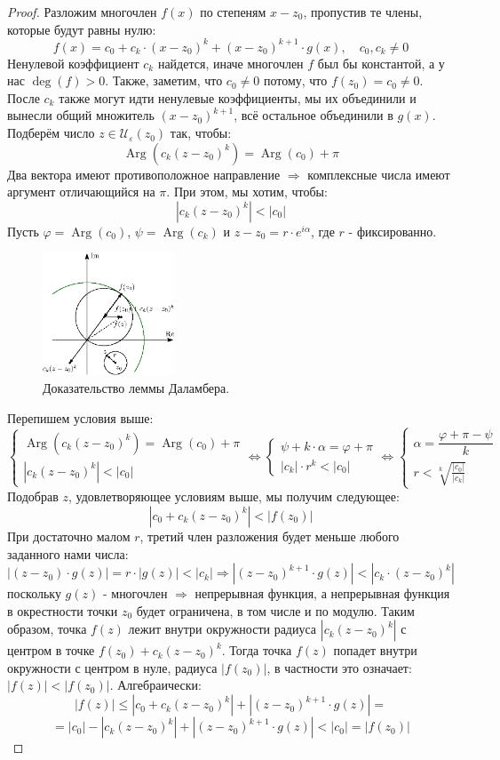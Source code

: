 \documentclass[12pt]{article}
\newcommand{\MU}{\mathcal{U}}
\newcommand{\VE}{\varepsilon}
\theoremstyle{definition}
\DeclareMathOperator\Arg{Arg}
\begin{document}
\begin{proof}
	Разложим многочлен $f(x)$ по степеням $x - z_0$, пропустив те члены, которые будут равны нулю:
	$$
		f(x) = c_0 + c_k{\cdot}(x - z_0)^k + (x - z_0)^{k+1}{\cdot}g(x), \quad c_0, c_k \neq 0
	$$
	Ненулевой коэффициент $c_k$ найдется, иначе многочлен $f$ был бы константой, а у нас $\deg(f) > 0$. Также, заметим, что $c_0 \neq 0$ потому, что $f(z_0) = c_0 \neq 0$. После $c_k$ также могут идти ненулевые коэффициенты, мы их объединили и вынесли общий множитель $(x - z_0)^{k+1}$, всё остальное объединили в $g(x)$. Подберём число $z \in \MU_{\VE}(z_0)$ так, чтобы: 
	$$
		\Arg(c_k(z- z_0)^k) = \Arg(c_0) + \pi
	$$ 
	Два вектора имеют противоположное направление $\Rightarrow$ комплексные числа имеют аргумент отличающийся на $\pi$. При этом, мы хотим, чтобы:
	$$
		|c_k(z-z_0)^k| < |c_0|
	$$
	Пусть $\varphi = \Arg(c_0)$, $\psi = \Arg(c_k)$ и $z - z_0 = r{\cdot}e^{i\alpha}$, где $r$ - фиксированно.
	\begin{figure}[H]
		\centering
		\includegraphics[width=0.35\textwidth]{AL1L18_4.eps}
		\caption{Доказательство леммы Даламбера.}
		\label{18_4}
	\end{figure}
	Перепишем условия выше:
	$$
		\begin{cases}
			\Arg(c_k(z- z_0)^k) = \Arg(c_0) + \pi\\
			|c_k(z-z_0)^k| < |c_0|
		\end{cases}\Leftrightarrow
		\begin{cases}
			\psi + k{\cdot}\alpha = \varphi + \pi\\
			|c_k|{\cdot}r^k < |c_0|
		\end{cases} \Leftrightarrow
		\begin{cases}
			\alpha = \dfrac{\varphi + \pi - \psi }{k}\\[8pt]
			r < \sqrt[k]{\tfrac{|c_0|}{|c_k|}}
		\end{cases}
	$$
	Подобрав $z$, удовлетворяющее условиям выше, мы получим следующее:
	$$
		|c_0 + c_k(z - z_0)^k| < |f(z_0)|
	$$
	При достаточно малом $r$, третий член разложения будет меньше любого заданного нами числа:
	$$
		|(z - z_0){\cdot}g(z)| = r{\cdot}|g(z)| < |c_k| \Rightarrow |(z - z_0)^{k+1}{\cdot}g(z)| < |c_k{\cdot}(z - z_0)^k|
	$$
	поскольку $g(z)$ - многочлен $\Rightarrow$ непрерывная функция, а непрерывная функция в окрестности точки $z_0$ будет ограничена, в том числе и по модулю. Таким образом, точка $f(z)$ лежит внутри окружности радиуса $|c_k(z - z_0)^k|$ с центром в точке $f(z_0) + c_k(z - z_0)^k$. Тогда точка $f(z)$ попадет внутри окружности с центром в нуле, радиуса $|f(z_0)|$, в частности это означает: $|f(z)| < |f(z_0)|$. Алгебраически:
	$$
		|f(z)| \leq |c_0 + c_k(z -z_0)^k| + |(z - z_0)^{k+1}{\cdot}g(z)| = 
	$$
	$$
		=|c_0| - |c_k(z - z_0)^k| + |(z - z_0)^{k+1}{\cdot}g(z)| < |c_0| = |f(z_0)|
	$$
\end{proof}
\end{document}
